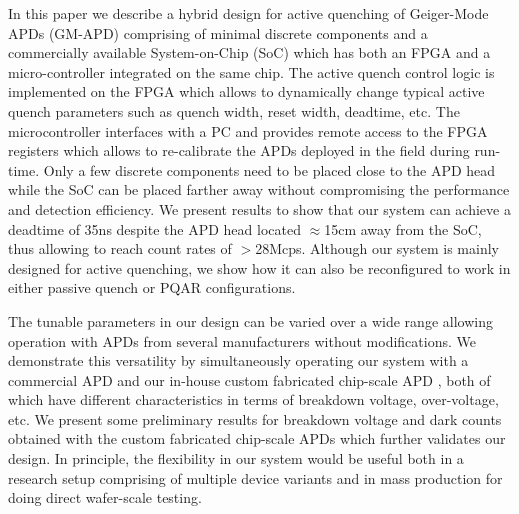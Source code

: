 In this paper we describe a hybrid design for active quenching of Geiger-Mode APDs (GM-APD) comprising of minimal discrete components and a commercially available System-on-Chip (SoC) \cite{zedboard} which has both an FPGA and a micro-controller integrated on the same chip. The active quench control logic is implemented on the FPGA which allows to dynamically change typical active quench parameters such as quench width, reset width, deadtime, etc. The microcontroller interfaces with a PC and provides remote access to the FPGA registers which allows to re-calibrate the APDs deployed in the field during run-time. Only a few discrete components need to be placed close to the APD head while the SoC can be placed farther away without compromising the performance and detection efficiency. We present results to show that our system can achieve a deadtime of 35ns despite the APD head located $\approx$15cm away from the SoC, thus allowing to reach count rates of $>$28Mcps. Although our system is mainly designed for active quenching, we show how it can also be reconfigured to work in either passive quench or PQAR configurations.



The tunable parameters in our design can be varied over a wide range allowing operation with APDs from several manufacturers without modifications. We demonstrate this versatility by simultaneously operating our system with a commercial APD \cite{sap500} and our in-house custom fabricated chip-scale APD \cite{imreAPD21}, both of which have different characteristics in terms of breakdown voltage, over-voltage, etc. We present some preliminary results for breakdown voltage and dark counts obtained with the custom fabricated chip-scale APDs which further validates our design. In principle, the flexibility in our system would be useful both in a research setup comprising of multiple device variants and in mass production for doing direct wafer-scale testing. 

